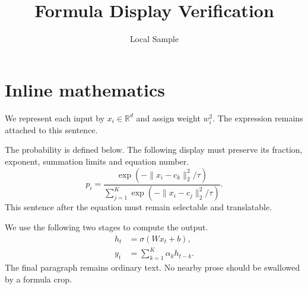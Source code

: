 \documentclass[11pt,twocolumn]{article}
\title{Formula Display Verification}
\author{Local Sample}
\date{}
\begin{document}
\maketitle
\section{Inline mathematics}
We represent each input by $x_i\in\mathbb{R}^{d}$ and assign weight $w_i^2$. The expression remains attached to this sentence.

The probability is defined below. The following display must preserve its fraction, exponent, summation limits and equation number.
\begin{equation}
p_i=\frac{\exp(-\|x_i-c_k\|_2^2/\tau)}{\sum_{j=1}^{K}\exp(-\|x_i-c_j\|_2^2/\tau)}.
\end{equation}
This sentence after the equation must remain selectable and translatable.

We use the following two stages to compute the output.
\begin{align}
h_t&=\sigma(Wx_t+b),\\
y_t&=\sum_{k=1}^{K}\alpha_k h_{t-k}.
\end{align}
The final paragraph remains ordinary text. No nearby prose should be swallowed by a formula crop.
\end{document}

